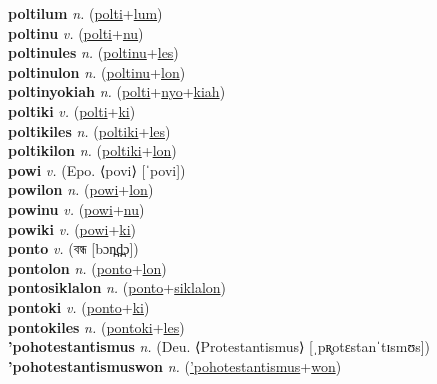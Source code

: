 \textbf{poltilum} \textit{n.} (\hyperref[polti]{polti}+\hyperref[lum]{lum})
 \label{poltilum} \\
\textbf{poltinu} \textit{v.} (\hyperref[polti]{polti}+\hyperref[nu]{nu})
 \label{poltinu} \\
\textbf{poltinules} \textit{n.} (\hyperref[poltinu]{poltinu}+\hyperref[les]{les})
 \label{poltinules} \\
\textbf{poltinulon} \textit{n.} (\hyperref[poltinu]{poltinu}+\hyperref[lon]{lon})
 \label{poltinulon} \\
\textbf{poltinyokiah} \textit{n.} (\hyperref[polti]{polti}+\hyperref[nyo]{nyo}+\hyperref[kiah]{kiah})
 \label{poltinyokiah} \\
\textbf{poltiki} \textit{v.} (\hyperref[polti]{polti}+\hyperref[ki]{ki})
 \label{poltiki} \\
\textbf{poltikiles} \textit{n.} (\hyperref[poltiki]{poltiki}+\hyperref[les]{les})
 \label{poltikiles} \\
\textbf{poltikilon} \textit{n.} (\hyperref[poltiki]{poltiki}+\hyperref[lon]{lon})
 \label{poltikilon} \\
\textbf{powi} \textit{v.} (Epo. ⟨povi⟩ [ˈpovi])
 \label{powi} \\
\textbf{powilon} \textit{n.} (\hyperref[powi]{powi}+\hyperref[lon]{lon})
 \label{powilon} \\
\textbf{powinu} \textit{v.} (\hyperref[powi]{powi}+\hyperref[nu]{nu})
 \label{powinu} \\
\textbf{powiki} \textit{v.} (\hyperref[powi]{powi}+\hyperref[ki]{ki})
 \label{powiki} \\
\textbf{ponto} \textit{v.} ({\bengali{}বন্ধ} [bɔn̪d̪̤ɔ])
 \label{ponto} \\
\textbf{pontolon} \textit{n.} (\hyperref[ponto]{ponto}+\hyperref[lon]{lon})
 \label{pontolon} \\
\textbf{pontosiklalon} \textit{n.} (\hyperref[ponto]{ponto}+\hyperref[siklalon]{siklalon})
 \label{pontosiklalon} \\
\textbf{pontoki} \textit{v.} (\hyperref[ponto]{ponto}+\hyperref[ki]{ki})
 \label{pontoki} \\
\textbf{pontokiles} \textit{n.} (\hyperref[pontoki]{pontoki}+\hyperref[les]{les})
 \label{pontokiles} \\
\textbf{'pohotestantismus} \textit{n.} (Deu. ⟨Protestantismus⟩ [ˌpʀ̥otɛstanˈtɪsmʊs])
 \label{'pohotestantismus} \\
\textbf{'pohotestantismuswon} \textit{n.} (\hyperref['pohotestantismus]{'pohotestantismus}+\hyperref[won]{won})
